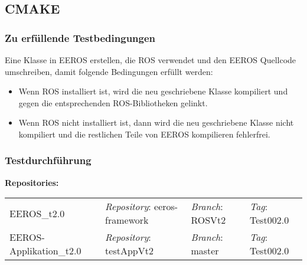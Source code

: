 \subsection{CMAKE}
\subsubsection{Zu erfüllende Testbedingungen}
Eine Klasse in EEROS erstellen, die ROS verwendet und den EEROS Quellcode umschreiben, damit folgende Bedingungen erfüllt werden:
\begin{itemize}
\item Wenn ROS installiert ist, wird die neu geschriebene Klasse kompiliert und gegen die entsprechenden ROS-Bibliotheken gelinkt.
\item Wenn ROS nicht installiert ist, dann wird die neu geschriebene Klasse nicht kompiliert und die restlichen Teile von EEROS kompilieren fehlerfrei.
\end{itemize}

\subsubsection{Testdurchführung}
\textbf{Repositories:} \\
\begin{tabular}
  { l						| l			 							l								 l								}

  EEROS\_t2.0				& \textit{Repository}: eeros-framework	& \textit{Branch}: ROSVt2		& \textit{Tag}: Test002.0 		\\
  EEROS-Applikation\_t2.0	& \textit{Repository}: testAppVt2		& \textit{Branch}: master		& \textit{Tag}: Test002.0 		\\
\end{tabular}

